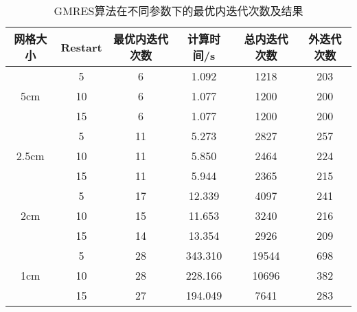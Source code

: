 \begin{table}
\centering
\caption{\label{tab:equsolve.iter.gmres}GMRES算法在不同参数下的最优内迭代次数及结果}
\begin{tabular}{cccccc}
\toprule
网格大小 & Restart & 最优内迭代次数 & 计算时间/s & 总内迭代次数 & 外迭代次数\\
\midrule
\multirow{3}{*}{5cm}
 & 5 & 6 & 1.092 & 1218 & 203\\
 & 10 & 6 & 1.077 & 1200 & 200\\
 & 15 & 6 & 1.077 & 1200 & 200\\
\multirow{3}{*}{2.5cm}
 & 5 & 11 & 5.273 & 2827 & 257\\
 & 10 & 11 & 5.850 & 2464 & 224\\
 & 15 & 11 & 5.944 & 2365 & 215\\
\multirow{3}{*}{2cm}
 & 5 & 17 & 12.339 & 4097 & 241\\
 & 10 & 15 & 11.653 & 3240 & 216\\
 & 15 & 14 & 13.354 & 2926 & 209\\
\multirow{3}{*}{1cm}
 & 5 & 28 & 343.310 & 19544 & 698\\
 & 10 & 28 & 228.166 & 10696 & 382\\
 & 15 & 27 & 194.049 & 7641 & 283\\
\bottomrule
\end{tabular}
\end{table}


